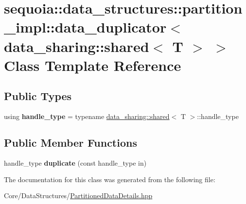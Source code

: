\hypertarget{classsequoia_1_1data__structures_1_1partition__impl_1_1data__duplicator_3_01data__sharing_1_1shared_3_01_t_01_4_01_4}{}\section{sequoia\+::data\+\_\+structures\+::partition\+\_\+impl\+::data\+\_\+duplicator$<$ data\+\_\+sharing\+::shared$<$ T $>$ $>$ Class Template Reference}
\label{classsequoia_1_1data__structures_1_1partition__impl_1_1data__duplicator_3_01data__sharing_1_1shared_3_01_t_01_4_01_4}
\subsection*{Public Types}
\begin{DoxyCompactItemize}
\item 
\mbox{\label{classsequoia_1_1data__structures_1_1partition__impl_1_1data__duplicator_3_01data__sharing_1_1shared_3_01_t_01_4_01_4_a789de879f4a4c57ddb014d893f09424c}} 
using {\bfseries handle\+\_\+type} = typename \mbox{\hyperlink{structsequoia_1_1data__sharing_1_1shared}{data\+\_\+sharing\+::shared}}$<$ T $>$\+::handle\+\_\+type
\end{DoxyCompactItemize}
\subsection*{Public Member Functions}
\begin{DoxyCompactItemize}
\item 
\mbox{\label{classsequoia_1_1data__structures_1_1partition__impl_1_1data__duplicator_3_01data__sharing_1_1shared_3_01_t_01_4_01_4_a1df80e14e35b598f0ff8d6f8e381bb4c}} 
handle\+\_\+type {\bfseries duplicate} (const handle\+\_\+type in)
\end{DoxyCompactItemize}


The documentation for this class was generated from the following file\+:\begin{DoxyCompactItemize}
\item 
Core/\+Data\+Structures/\mbox{\hyperlink{_partitioned_data_details_8hpp}{Partitioned\+Data\+Details.\+hpp}}\end{DoxyCompactItemize}

